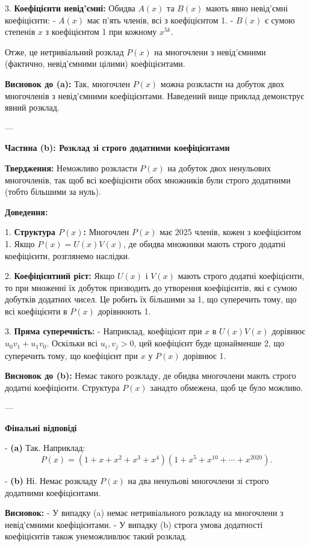 \documentclass{article}
\begin{document}
3. \textbf{Коефіцієнти невід'ємні:}
   Обидва \( A(x) \) та \( B(x) \) мають явно невід'ємні коефіцієнти:
   - \( A(x) \) має п'ять членів, всі з коефіцієнтом 1.
   - \( B(x) \) є сумою степенів \( x \) з коефіцієнтом 1 при кожному \( x^{5k} \).

   Отже, це нетривіальний розклад \( P(x) \) на многочлени з невід'ємними (фактично, невід'ємними цілими) коефіцієнтами.

\textbf{Висновок до (a):} Так, многочлен \( P(x) \) можна розкласти на добуток двох многочленів з невід'ємними коефіцієнтами. Наведений вище приклад демонструє явний розклад.

---

\textbf{Частина (b): Розклад зі строго додатними коефіцієнтами}

\textbf{Твердження:} Неможливо розкласти \( P(x) \) на добуток двох ненульових многочленів, так щоб всі коефіцієнти обох множників були строго додатними (тобто більшими за нуль).

\textbf{Доведення:}

1. \textbf{Структура \( P(x) \):}
   Многочлен \( P(x) \) має 2025 членів, кожен з коефіцієнтом 1. Якщо \( P(x) = U(x)V(x) \), де обидва множники мають строго додатні коефіцієнти, розглянемо наслідки.

2. \textbf{Коефіцієнтний ріст:}
   Якщо \( U(x) \) і \( V(x) \) мають строго додатні коефіцієнти, то при множенні їх добуток призводить до утворення коефіцієнтів, які є сумою добутків додатних чисел. Це робить їх більшими за 1, що суперечить тому, що всі коефіцієнти в \( P(x) \) дорівнюють 1.

3. \textbf{Пряма суперечність:}
   - Наприклад, коефіцієнт при \( x \) в \( U(x)V(x) \) дорівнює \( u_0v_1 + u_1v_0 \). Оскільки всі \( u_i, v_j > 0 \), цей коефіцієнт буде щонайменше 2, що суперечить тому, що коефіцієнт при \( x \) у \( P(x) \) дорівнює 1.

\textbf{Висновок до (b):} Немає такого розкладу, де обидва многочлени мають строго додатні коефіцієнти. Структура \( P(x) \) занадто обмежена, щоб це було можливо.

---

\textbf{Фінальні відповіді}

- \textbf{(a)} Так. Наприклад:
  \[
  P(x) = (1 + x + x^2 + x^3 + x^4)(1 + x^5 + x^{10} + \cdots + x^{2020}).
  \]

- \textbf{(b)} Ні. Немає розкладу \( P(x) \) на два ненульові многочлени зі строго додатними коефіцієнтами.

\textbf{Висновок:}  
- У випадку (a) немає нетривіального розкладу на многочлени з невід’ємними коефіцієнтами.  
- У випадку (b) строга умова додатності коефіцієнтів також унеможливлює такий розклад.
\end{document}
